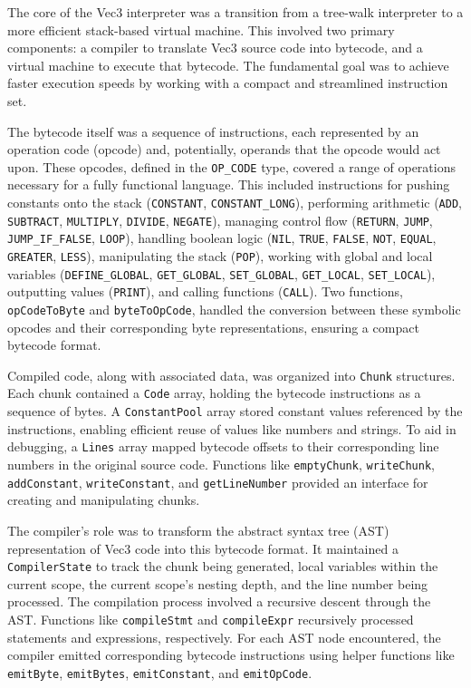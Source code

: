 The core of the Vec3 interpreter was a transition from a tree-walk interpreter to a more efficient stack-based virtual machine. 
This involved two primary components: a compiler to translate Vec3 source code into bytecode, and a virtual machine to execute that bytecode. 
The fundamental goal was to achieve faster execution speeds by working with a compact and streamlined instruction set.

The bytecode itself was a sequence of instructions, each represented by an operation code (opcode) and, potentially, operands that the opcode would act upon. 
These opcodes, defined in the \texttt{OP\_CODE} type, covered a range of operations necessary for a fully functional language. 
This included instructions for pushing constants onto the stack (\texttt{CONSTANT}, \texttt{CONSTANT\_LONG}), performing arithmetic (\texttt{ADD}, \texttt{SUBTRACT}, \texttt{MULTIPLY}, \texttt{DIVIDE}, \texttt{NEGATE}), managing control flow (\texttt{RETURN}, \texttt{JUMP}, \texttt{JUMP\_IF\_FALSE}, \texttt{LOOP}), handling boolean logic (\texttt{NIL}, \texttt{TRUE}, \texttt{FALSE}, \texttt{NOT}, \texttt{EQUAL}, \texttt{GREATER}, \texttt{LESS}), manipulating the stack (\texttt{POP}), working with global and local variables (\texttt{DEFINE\_GLOBAL}, \texttt{GET\_GLOBAL}, \texttt{SET\_GLOBAL}, \texttt{GET\_LOCAL}, \texttt{SET\_LOCAL}), outputting values (\texttt{PRINT}), and calling functions (\texttt{CALL}). Two functions, \texttt{opCodeToByte} and \texttt{byteToOpCode}, handled the conversion between these symbolic opcodes and their corresponding byte representations, ensuring a compact bytecode format.

Compiled code, along with associated data, was organized into \texttt{Chunk} structures. 
Each chunk contained a \texttt{Code} array, holding the bytecode instructions as a sequence of bytes. 
A \texttt{ConstantPool} array stored constant values referenced by the instructions, enabling efficient reuse of values like numbers and strings. 
To aid in debugging, a \texttt{Lines} array mapped bytecode offsets to their corresponding line numbers in the original source code. 
Functions like \texttt{emptyChunk}, \texttt{writeChunk}, \texttt{addConstant}, \texttt{writeConstant}, and \texttt{getLineNumber} provided an interface for creating and manipulating chunks.

The compiler's role was to transform the abstract syntax tree (AST) representation of Vec3 code into this bytecode format. 
It maintained a \texttt{CompilerState} to track the chunk being generated, local variables within the current scope, the current scope's nesting depth, and the line number being processed. 
The compilation process involved a recursive descent through the AST. Functions like \texttt{compileStmt} and \texttt{compileExpr} recursively processed statements and expressions, respectively. 
For each AST node encountered, the compiler emitted corresponding bytecode instructions using helper functions like \texttt{emitByte}, \texttt{emitBytes}, \texttt{emitConstant}, and \texttt{emitOpCode}.

